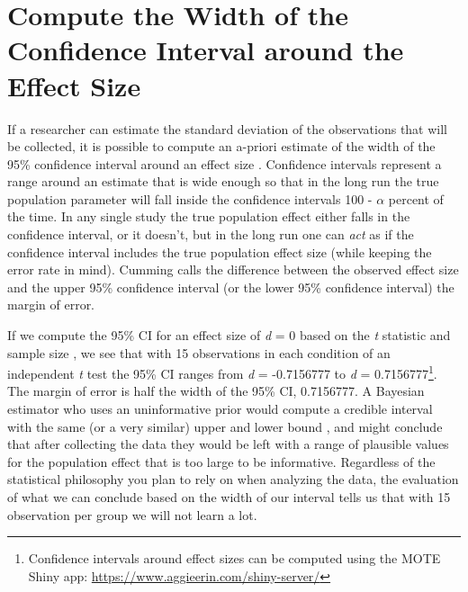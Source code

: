 \documentclass[
]{krantz}
\begin{document}
\hypertarget{compute-the-width-of-the-confidence-interval-around-the-effect-size}{%
\section{Compute the Width of the Confidence Interval around the Effect Size}\label{compute-the-width-of-the-confidence-interval-around-the-effect-size}}

If a researcher can estimate the standard deviation of the observations that will be collected, it is possible to compute an a-priori estimate of the width of the 95\% confidence interval around an effect size \citep{kelley_confidence_2007}. Confidence intervals represent a range around an estimate that is wide enough so that in the long run the true population parameter will fall inside the confidence intervals 100 - \(\alpha\) percent of the time. In any single study the true population effect either falls in the confidence interval, or it doesn't, but in the long run one can \emph{act} as if the confidence interval includes the true population effect size (while keeping the error rate in mind). Cumming \citeyearpar{cumming_understanding_2013} calls the difference between the observed effect size and the upper 95\% confidence interval (or the lower 95\% confidence interval) the margin of error.

If we compute the 95\% CI for an effect size of \emph{d} = 0 based on the \emph{t} statistic and sample size \citep{smithson_confidence_2003}, we see that with 15 observations in each condition of an independent \emph{t} test the 95\% CI ranges from \emph{d} = -0.7156777 to \emph{d} = 0.7156777\footnote{Confidence intervals around effect sizes can be computed using the MOTE Shiny app: \url{https://www.aggieerin.com/shiny-server/}}. The margin of error is half the width of the 95\% CI, 0.7156777. A Bayesian estimator who uses an uninformative prior would compute a credible interval with the same (or a very similar) upper and lower bound \citep{albers_credible_2018, kruschke_bayesian_2011}, and might conclude that after collecting the data they would be left with a range of plausible values for the population effect that is too large to be informative. Regardless of the statistical philosophy you plan to rely on when analyzing the data, the evaluation of what we can conclude based on the width of our interval tells us that with 15 observation per group we will not learn a lot.
\end{document}
